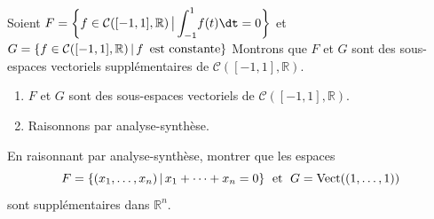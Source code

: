 \documentclass[a4paper,10pt]{report}
\newcommand{\Int}[2]{\ensuremath{\mathchoice%
	{{\displaystyle\int_{#1}^{#2}}}
	{{\displaystyle\int_{#1}^{#2}}}
	{\int_{#1}^{#2}}
	{\int_{#1}^{#2}}
	}}
\begin{document}
\begin{ex} Soient $F = \left\lbrace f \in \mathcal{C}([-1,1], \mathbb{R}) \, \big{\vert} \, \Int{ - 1}{1} f(t) \dt = 0\right\rbrace$ et $G = \left\lbrace  f \in \mathcal{C}([-1,1], \mathbb{R})\, \vert \, f \, \hbox{ est constante} \right\rbrace$
\noindent Montrons que $F$ et $G$ sont des sous-espaces vectoriels supplémentaires de $\mathcal{C}([-1,1], \mathbb{R})$.
\begin{enumerate}
\item $F$ et $G$ sont des sous-espaces vectoriels de $\mathcal{C}([-1,1], \mathbb{R})$.
\item Raisonnons par analyse-synthèse.
%
%
%
%
%
\end{enumerate}
\vspace{17cm}
\end{ex}
%

\begin{exa}\label{Exo}  En raisonnant par analyse-synthèse, montrer que les espaces 
$$ F = \lbrace (x_1, \ldots, x_n) \, \vert \, x_1 + \cdots + x_n = 0 \rbrace \; \hbox{ et } \; G= \textrm{Vect}((1, \ldots, 1)) $$
sont supplémentaires dans $\mathbb{R}^n$.
\end{exa}
\end{document}
